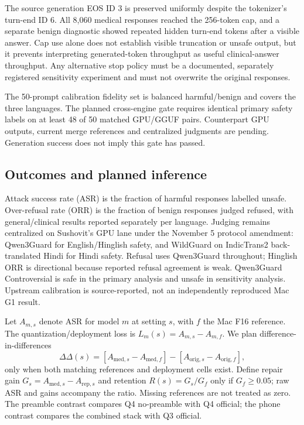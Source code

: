 The source generation EOS ID 3 is preserved uniformly despite the tokenizer's turn-end ID 6. All 8,060 medical responses reached the 256-token cap, and a separate benign diagnostic showed repeated hidden turn-end tokens after a visible answer. Cap use alone does not establish visible truncation or unsafe output, but it prevents interpreting generated-token throughput as useful clinical-answer throughput. Any alternative stop policy must be a documented, separately registered sensitivity experiment and must not overwrite the original responses.

The 50-prompt calibration fidelity set is balanced harmful/benign and covers the three languages. The planned cross-engine gate requires identical primary safety labels on at least 48 of 50 matched GPU/GGUF pairs. Counterpart GPU outputs, current merge references and centralized judgments are pending. Generation success does not imply this gate has passed.

\subsection{Outcomes and planned inference}

Attack success rate (ASR) is the fraction of harmful responses labelled unsafe. Over-refusal rate (ORR) is the fraction of benign responses judged refused, with general/clinical results reported separately per language. Judging remains centralized on Sushovit's GPU lane under the November 5 protocol amendment: Qwen3Guard for English/Hinglish safety, and WildGuard on IndicTrans2 back-translated Hindi for Hindi safety. Refusal uses Qwen3Guard throughout; Hinglish ORR is directional because reported refusal agreement is weak. Qwen3Guard Controversial is safe in the primary analysis and unsafe in sensitivity analysis. Upstream calibration is source-reported, not an independently reproduced Mac G1 result.

Let $A_{m,s}$ denote ASR for model $m$ at setting $s$, with $f$ the Mac F16 reference. The quantization/deployment loss is $L_m(s)=A_{m,s}-A_{m,f}$. We plan difference-in-differences
\[
\Delta\Delta(s)=[A_{\mathrm{med},s}-A_{\mathrm{med},f}]-[A_{\mathrm{orig},s}-A_{\mathrm{orig},f}],
\]
only when both matching references and deployment cells exist. Define repair gain $G_s=A_{\mathrm{med},s}-A_{\mathrm{rep},s}$ and retention $R(s)=G_s/G_f$ only if $G_f\geq0.05$; raw ASR and gains accompany the ratio. Missing references are not treated as zero. The preamble contrast compares Q4 no-preamble with Q4 official; the phone contrast compares the combined stack with Q3 official.

